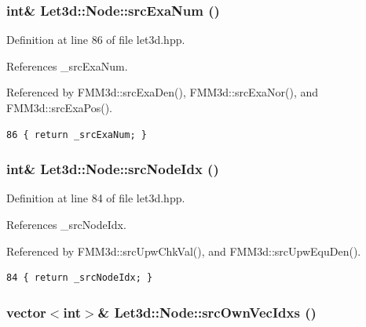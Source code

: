 \subsubsection{\setlength{\rightskip}{0pt plus 5cm}int\& Let3d::Node::src\-Exa\-Num ()\hspace{0.3cm}{\tt  [inline]}}\label{classLet3d_1_1Node_3242f04a3b3d94ce1f54b5487407a6fc_3242f04a3b3d94ce1f54b5487407a6fc}




Definition at line 86 of file let3d.hpp.

References \_\-src\-Exa\-Num.

Referenced by FMM3d::src\-Exa\-Den(), FMM3d::src\-Exa\-Nor(), and FMM3d::src\-Exa\-Pos().

\footnotesize\begin{verbatim}86 { return _srcExaNum; }
\end{verbatim}\normalsize 


\subsubsection{\setlength{\rightskip}{0pt plus 5cm}int\& Let3d::Node::src\-Node\-Idx ()\hspace{0.3cm}{\tt  [inline]}}\label{classLet3d_1_1Node_d80e13f0d280279c3c57b250358710f6_d80e13f0d280279c3c57b250358710f6}




Definition at line 84 of file let3d.hpp.

References \_\-src\-Node\-Idx.

Referenced by FMM3d::src\-Upw\-Chk\-Val(), and FMM3d::src\-Upw\-Equ\-Den().

\footnotesize\begin{verbatim}84 { return _srcNodeIdx; }
\end{verbatim}\normalsize 


\subsubsection{\setlength{\rightskip}{0pt plus 5cm}vector$<$int$>$\& Let3d::Node::src\-Own\-Vec\-Idxs ()\hspace{0.3cm}{\tt  [inline]}}\label{classLet3d_1_1Node_a036dfb5ce780a07052a415480d06f14_a036dfb5ce780a07052a415480d06f14}




